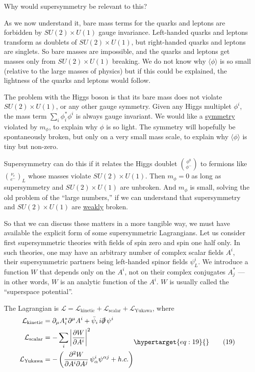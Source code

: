 \documentclass[11pt,a4paper]{article}
\newcommand{\eqtarget}[1]{\hypertarget{eq:#1}{\mathstrut}\tag{#1}}
\begin{document}
Why would supersymmetry be relevant to this?

As we now understand it, bare mass terms for the quarks and
leptons are forbidden by $SU(2) \times U(1)$ gauge invariance. Left-handed
quarks and leptons transform as doublets of $SU(2) \times U(1)$, but right-handed
quarks and leptons are singlets. So bare masses are impossible,
and the quarks and leptons get masses only from $SU(2) \times U(1)$
breaking. We do not know why $\langle \phi \rangle$ is so small (relative to the large
masses of physics) but if this could be explained, the lightness of
the quarks and leptons would follow.

The problem with the Higgs boson is that its bare mass does not
violate $SU(2) \times U(1)$, or any other gauge symmetry. Given any Higgs
multiplet $\phi^i$, the mass term $\sum_i \phi_i^* \phi^i$ is always gauge invariant. We
would like a \underline{symmetry} violated by $m_\phi$, to explain why $\phi$ is so light.
The symmetry will hopefully be spontaneously broken, but only on a
very small mass scale, to explain why $\langle \phi \rangle$ is tiny but non-zero.

Supersymmetry can do this if it relates the Higgs doublet $\binom{\phi^0}{\phi^-}$
to fermions like $\binom{\nu_e}{e^-}_L$ whose masses violate $SU(2) \times U(1)$. Then
$m_\phi = 0$ as long as supersymmetry and $SU(2) \times U(1)$ are unbroken. And
$m_\phi$ is small, solving the old problem of the ``large numbers,'' if we
can understand that supersymmetry and $SU(2) \times U(1)$ are \underline{weakly} broken.

So that we can discuss these matters in a more tangible way,
we must have available the explicit form of some supersymmetric Lagrangians.
Let us consider first supersymmetric theories with fields
of spin zero and spin one half only. In such theories, one may have
an arbitrary number of complex scalar fields $A^i$, their supersymmetric
partners being left-handed spinor fields $\psi_L^i$. We introduce a function
$W$ that depends only on the $A^i$, not on their complex conjugates $A^*_j$ ---
in other words, $W$ is an analytic function of the $A^i$. $W$ is usually
called the ``superspace potential''.

The Lagrangian is $\mathcal{L} = \mathcal{L}_{\mathrm{kinetic}} + \mathcal{L}_{\mathrm{scalar}} + \mathcal{L}_{\mathrm{Yukawa}}$, where
\begin{equation}
\begin{aligned}
\mathcal{L}_{\mathrm{kinetic}} &= \partial_\mu A_i^* \partial^\mu A^i + \bar\psi_i\, i \slashed{\partial}\, \psi^i \\
\mathcal{L}_{\mathrm{scalar}} &= - \sum_i \left|\frac{\partial W}{\partial A^i}\right|^2 \\
\mathcal{L}_{\mathrm{Yukawa}} &= - \left(\frac{\partial^2 W}{\partial A^i \partial A^j}\, \psi^i_\alpha \psi^{\alpha j} + h.c.\right)
\end{aligned}
\eqtarget{19}
\end{equation}
\end{document}
